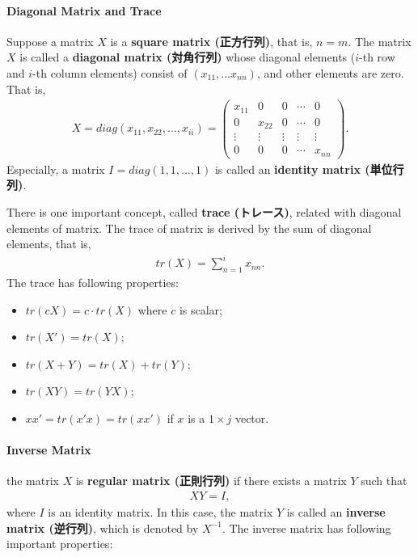 \documentclass[
  12pt,
]{article}
\providecommand{\tightlist}{%
  \setlength{\itemsep}{0pt}\setlength{\parskip}{0pt}}
\begin{document}
\hypertarget{diagonal-matrix-and-trace}{%
\paragraph{Diagonal Matrix and Trace}\label{diagonal-matrix-and-trace}}

Suppose a matrix \(X\) is a \textbf{square matrix (正方行列)}, that is, \(n = m\).
The matrix \(X\) is called a \textbf{diagonal matrix (対角行列)}
whose diagonal elements (\(i\)-th row and \(i\)-th column elements) consist of \((x_{11}, \ldots x_{nn})\),
and other elements are zero.
That is,
\begin{align*}
  X 
  = diag(x_{11}, x_{22}, \ldots, x_{ii})
  =
  \begin{pmatrix}
    x_{11} & 0 & 0 & \cdots & 0 \\
    0 & x_{22} & 0 & \cdots & 0 \\
    \vdots & \vdots & \vdots & \vdots & \vdots \\
    0 & 0 & 0 & \cdots & x_{nn}
  \end{pmatrix}.
\end{align*}
Especially, a matrix \(I = diag(1, 1, \ldots, 1)\) is called an \textbf{identity matrix (単位行列)}.

There is one important concept, called \textbf{trace (トレース)}, related with diagonal elements of matrix.
The trace of matrix is derived by the sum of diagonal elements, that is,
\begin{align*}
  tr(X) = \sum_{n = 1}^{i} x_{nn}.
\end{align*}
The trace has following properties:

\begin{itemize}
\tightlist
\item
  \(tr(cX) = c \cdot tr(X)\) where \(c\) is scalar;
\item
  \(tr(X') = tr(X)\);
\item
  \(tr(X + Y) = tr(X) + tr(Y)\);
\item
  \(tr(XY) = tr(YX)\);
\item
  \(xx' = tr(x'x) = tr(x x')\) if \(x\) is a \(1 \times j\) vector.
\end{itemize}

\hypertarget{inverse-matrix}{%
\paragraph{Inverse Matrix}\label{inverse-matrix}}

the matrix \(X\) is \textbf{regular matrix (正則行列)} if there exists a matrix \(Y\) such that
\begin{align*}
  X Y = I,
\end{align*}
where \(I\) is an identity matrix.
In this case, the matrix \(Y\) is called an \textbf{inverse matrix (逆行列)}, which is denoted by \(X^{-1}\).
The inverse matrix has following important properties:
\end{document}
